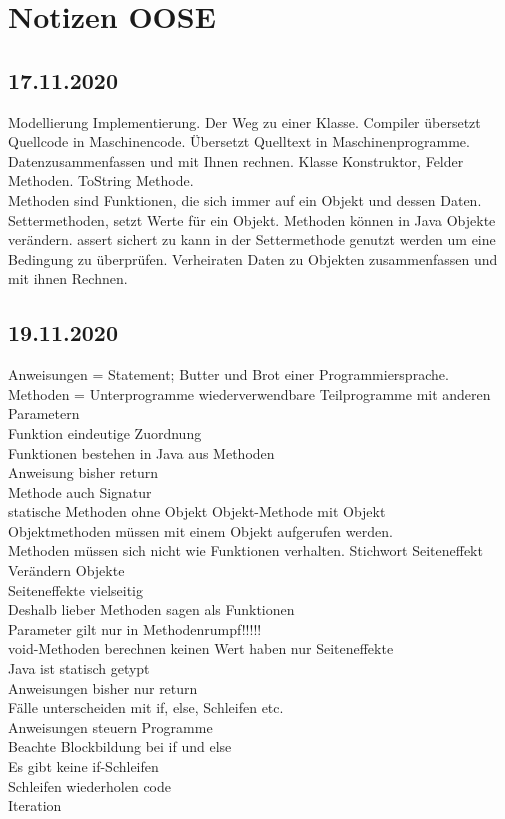 \documentclass{article}
\begin{document}
	\section*{Notizen OOSE}
	\subsection*{17.11.2020}
	Modellierung Implementierung. Der Weg zu einer Klasse. Compiler übersetzt Quellcode in Maschinencode. Übersetzt Quelltext in Maschinenprogramme. \\
	
	Datenzusammenfassen und mit Ihnen rechnen. Klasse Konstruktor, Felder Methoden. ToString Methode. \\
	
	Methoden sind Funktionen, die sich immer auf ein Objekt und dessen Daten. Settermethoden, setzt Werte für ein Objekt. Methoden können in Java Objekte verändern. assert sichert zu kann in der Settermethode genutzt werden um eine Bedingung zu überprüfen. Verheiraten Daten zu Objekten zusammenfassen und mit ihnen Rechnen.
	
	\subsection*{19.11.2020}
	Anweisungen = Statement; Butter und Brot einer Programmiersprache. \\
	Methoden = Unterprogramme wiederverwendbare Teilprogramme mit anderen Parametern \\
	Funktion eindeutige Zuordnung \\
	Funktionen bestehen in Java aus Methoden \\
	Anweisung bisher return \\
	Methode auch Signatur \\
	statische Methoden ohne Objekt Objekt-Methode mit Objekt \\
	Objektmethoden müssen mit einem Objekt aufgerufen werden. \\
	Methoden müssen sich nicht wie Funktionen verhalten. Stichwort Seiteneffekt \\
	Verändern Objekte \\
	Seiteneffekte vielseitig  \\
	Deshalb lieber Methoden sagen als Funktionen \\
	Parameter gilt nur in Methodenrumpf!!!!! \\
	void-Methoden berechnen keinen Wert haben nur Seiteneffekte \\
	Java ist statisch getypt \\
	Anweisungen bisher nur return  \\
	Fälle unterscheiden mit if, else, Schleifen etc. \\
	 Anweisungen steuern Programme \\
	 Beachte Blockbildung bei if und else \\
	 Es gibt keine if-Schleifen \\
	 Schleifen wiederholen code \\
	 Iteration \\
\end{document}
